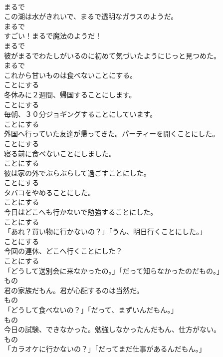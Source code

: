 \documentclass[8pt]{extreport}
\begin{document}
\begin{CJK}{UTF8}{min}
\\	まるで	
\\	この湖は水がきれいで、まるで透明なガラスのようだ。	
\\	まるで	
\\	すごい！まるで魔法のようだ！	
\\	まるで	
\\	彼がまるでわたしがいるのに初めて気づいたようにじっと見つめた。	
\\	まるで	
\\	これから甘いものは食べないことにする。	
\\	ことにする	
\\	冬休みに２週間、帰国することにします。	
\\	ことにする	
\\	毎朝、３０分ジョギングすることにしています。	
\\	ことにする	
\\	外国へ行っていた友達が帰ってきた。パーティーを開くことにした。	
\\	ことにする	
\\	寝る前に食べないことにしました。	
\\	ことにする	
\\	彼は家の外でぶらぶらして過ごすことにした。	
\\	ことにする	
\\	タバコをやめることにした。	
\\	ことにする	
\\	今日はどこへも行かないで勉強することにした。	
\\	ことにする	
\\	「あれ？買い物に行かないの？」「うん、明日行くことにした。」	
\\	ことにする	
\\	今回の連休、どこへ行くことにした？	
\\	ことにする	
\\	「どうして送別会に来なかったの。」「だって知らなかったのだもの。」	
\\	もの	
\\	君の家族だもん。君が心配するのは当然だ。	
\\	もの	
\\	「どうして食べないの？」「だって、まずいんだもん。」	
\\	もの	
\\	今日の試験、できなかった。勉強しなかったんだもん、仕方がない。	
\\	もの	
\\	「カラオケに行かないの？」「だってまだ仕事があるんだもん。」	

\end{CJK}
\end{document}
